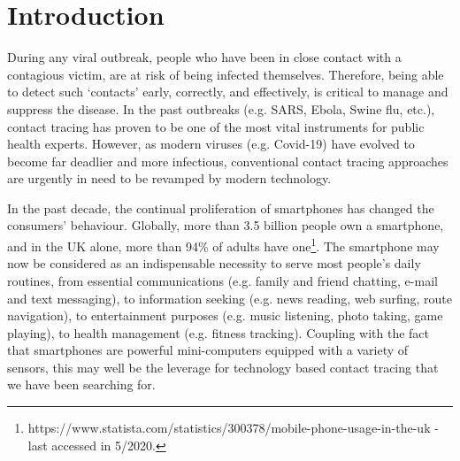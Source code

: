 \documentclass[graybox]{svmult}
\begin{document}





\section{Introduction}
During any viral outbreak, people who have been in close contact with a contagious victim, are at risk of being infected themselves. Therefore, being able to detect such `contacts' early, correctly, and effectively, is critical to manage and suppress the disease. In the past outbreaks (e.g. SARS, Ebola, Swine flu, etc.), contact tracing has proven to be one of the most vital instruments for public health experts. However, as modern viruses (e.g. Covid-19) have evolved to become far deadlier and more infectious, conventional contact tracing approaches are urgently in need to be revamped by modern technology.

In the past decade, the continual proliferation of smartphones has changed the consumers' behaviour. Globally, more than 3.5 billion people own a smartphone, and in the UK alone, more than 94\% of adults have one\footnote{https://www.statista.com/statistics/300378/mobile-phone-usage-in-the-uk - last accessed in 5/2020.}. The smartphone may now be considered as an indispensable necessity to serve most people's daily routines, from essential communications (e.g. family and friend chatting, e-mail and text messaging), to information seeking (e.g. news reading, web surfing, route navigation), to entertainment purposes (e.g. music listening, photo taking, game playing), to health management (e.g. fitness tracking). Coupling with the fact that smartphones are powerful mini-computers equipped with a variety of sensors, this may well be the leverage for technology based contact tracing that we have been searching for.
\end{document}
